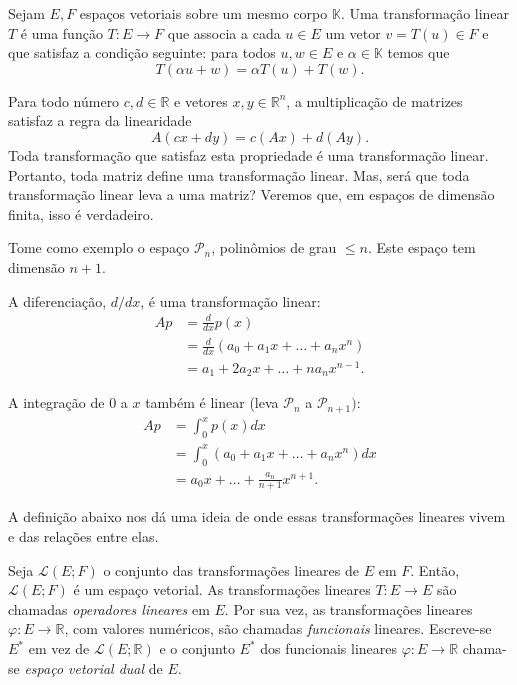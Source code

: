 \begin{defi}
Sejam $E,F$ espaços vetoriais sobre um mesmo corpo ${\mathbb{K}}$. Uma transformação linear $T$ é uma função $T:E\to F$ que associa a cada $u\in E$ um vetor $v=T(u) \in F$ e que satisfaz a condição seguinte: para todos $u,w\in E$ e $\alpha \in {\mathbb{K}}$ temos que
\begin{equation*}
	T(\alpha u+w) = \alpha T(u)+T(w).
\end{equation*}
\end{defi}

Para todo número $c,d\in {\mathbb{R}}$ e vetores $x,y\in {\mathbb{R}}^n$, a multiplicação de matrizes satisfaz a regra da linearidade
\begin{equation*}
    A(cx+dy)=c(Ax)+d(Ay).
\end{equation*}
Toda transformação que satisfaz esta propriedade é uma transformação linear. Portanto, toda matriz define uma transformação linear. Mas, será que toda transformação linear leva a uma matriz? Veremos que, em espaços de dimensão finita, isso é verdadeiro.

Tome como exemplo o espaço ${\mathcal{P}}_n$, polinômios de grau $\leq n$. Este espaço tem dimensão $n+1$.
\begin{exemplo}
    A diferenciação, $d/dx$, é uma transformação linear:
    \begin{align*}
        Ap &= \frac{d}{dx} p(x) \\
        &= \frac{d}{dx} (a_0+a_1x+\ldots+a_nx^n)\\
        & = a_1+2a_2x+\ldots+na_nx^{n-1}.
    \end{align*}
\end{exemplo}

\begin{exemplo}
    A integração de $0$ a $x$ também é linear (leva ${\mathcal{P}}_n$ a ${\mathcal{P}}_{n+1})$:
    \begin{align*}
        Ap &= \int_0^x p(x) dx \\
        &= \int_0^x (a_0+a_1x+\ldots+a_nx^n) dx \\
        &= a_0x + \ldots + \frac{a_n}{n+1} x^{n+1}.
    \end{align*}
\end{exemplo}

A definição abaixo nos dá uma ideia de onde essas transformações lineares vivem e das relações entre elas.

\begin{defi}
  Seja ${\mathcal{L}}(E;F)$ o conjunto das transformações lineares de $E$ em $F$. Então, ${\mathcal{L}}(E;F)$ é um espaço vetorial. As transformações lineares $T:E\rightarrow E$ são chamadas \emph{operadores lineares} em $E$. Por sua vez, as transformações lineares $\varphi:E\rightarrow {\mathbb{R}}$, com valores numéricos, são chamadas \emph{funcionais} lineares. Escreve-se $E^*$ em vez de ${\mathcal{L}}(E;{\mathbb{R}})$ e o conjunto $E^*$ dos funcionais lineares $\varphi:E\rightarrow {\mathbb{R}}$ chama-se \emph{espaço vetorial dual} de $E$.
\end{defi}


